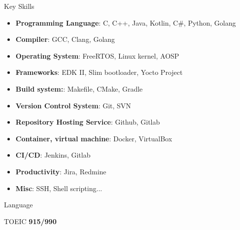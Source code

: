 \documentclass{resume} %
\begin{document}

\begin{rSection}{Key Skills}
\begin{itemize}
    \item \textbf{Programming Language}: C, C++, Java, Kotlin, C\#, Python, Golang
    \item \textbf{Compiler}: GCC, Clang, Golang
    \item \textbf{Operating System}: FreeRTOS, Linux kernel, AOSP
    \item \textbf{Frameworks}: EDK II, Slim bootloader, Yocto Project
    \item \textbf{Build system:}: Makefile, CMake, Gradle
    \item \textbf{Version Control System}: Git, SVN
    \item \textbf{Repository Hosting Service}: Github, Gitlab
    \item \textbf{Container, virtual machine}: Docker, VirtualBox
    \item \textbf{CI/CD}: Jenkins, Gitlab
    \item \textbf{Productivity}: Jira, Redmine
    \item \textbf{Misc}: SSH, Shell scripting...
\end{itemize}
\end{rSection}
\begin{rSection}{Language} \itemsep -3pt
\item TOEIC \textbf{915/990}
\end{rSection}






\end{document}
